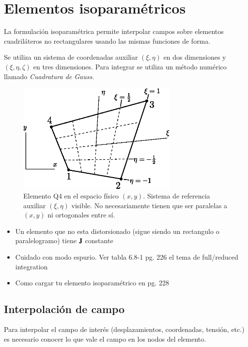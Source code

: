 \section{Elementos isoparamétricos}
La formulación isoparamétrica permite interpolar campos sobre elementos cuadriláteros no rectangulares usando las mismas funciones de forma.

Se utiliza un sistema de coordenadas auxiliar $(\xi,\eta)$ en dos dimensiones y $(\xi,\eta,\zeta)$ en tres dimensiones. Para integrar se utiliza un método numérico llamado \textit{Cuadratura de Gauss}.



\begin{figure}
	\centering
	\includegraphics[width=8cm]{fig/q4isoparam.eps}
	\caption{Elemento Q4 en el espacio físico $(x,y)$. Sistema de referencia auxiliar $(\xi,\eta)$ visible. No necesariamente tienen que ser paralelas a $(x,y)$ ni ortogonales entre sí.}
	\label{fig:q4isoparam}
\end{figure}

\begin{itemize}
	\item Un elemento que no esta distorsionado (sigue siendo un rectangulo o paralelogramo) tiene $\jac$ constante
	\item Cuidado con modo espurio. Ver tabla 6.8-1 pg. 226 el tema de full/reduced integration \cite{cook2007concepts}
	\item Como cargar tu elemento isoparamétrico en pg. 228
\end{itemize}


\subsection*{Interpolación de campo}

Para interpolar el campo de interés (desplazamientos, coordenadas, tensión, etc.) es necesario conocer lo que vale el campo en los nodos del elemento.

